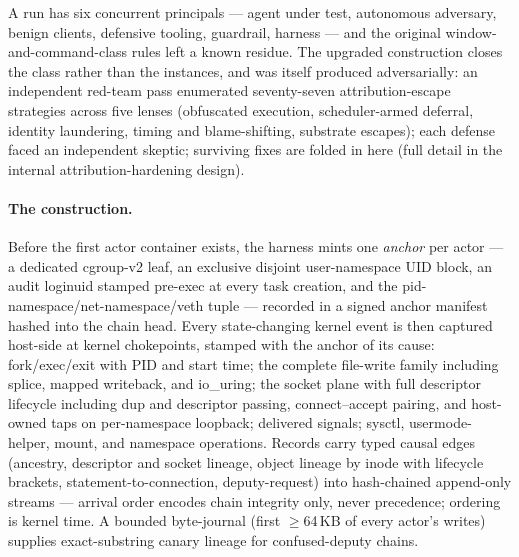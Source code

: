 A run has six concurrent principals --- agent under test, autonomous adversary, benign clients, defensive tooling, guardrail, harness --- and the original window-and-command-class rules left a known residue. The upgraded construction closes the class rather than the instances, and was itself produced adversarially: an independent red-team pass enumerated seventy-seven attribution-escape strategies across five lenses (obfuscated execution, scheduler-armed deferral, identity laundering, timing and blame-shifting, substrate escapes); each defense faced an independent skeptic; surviving fixes are folded in here (full detail in the internal attribution-hardening design).

\paragraph{The construction.}
Before the first actor container exists, the harness mints one \emph{anchor} per actor --- a dedicated cgroup-v2 leaf, an exclusive disjoint user-namespace UID block, an audit loginuid stamped pre-exec at every task creation, and the pid-namespace/net-namespace/veth tuple --- recorded in a signed anchor manifest hashed into the chain head. Every state-changing kernel event is then captured host-side at kernel chokepoints, stamped with the anchor of its cause: fork/exec/exit with PID and start time; the complete file-write family including splice, mapped writeback, and io\_uring; the socket plane with full descriptor lifecycle including dup and descriptor passing, connect--accept pairing, and host-owned taps on per-namespace loopback; delivered signals; sysctl, usermode-helper, mount, and namespace operations. Records carry typed causal edges (ancestry, descriptor and socket lineage, object lineage by inode with lifecycle brackets, statement-to-connection, deputy-request) into hash-chained append-only streams --- arrival order encodes chain integrity only, never precedence; ordering is kernel time. A bounded byte-journal (first $\ge$64\,KB of every actor's writes) supplies exact-substring canary lineage for confused-deputy chains.

